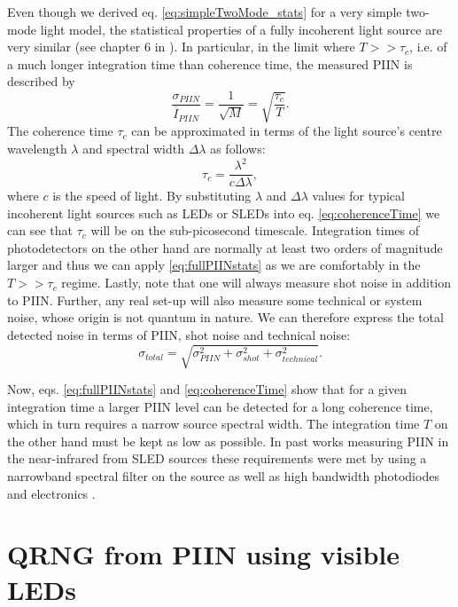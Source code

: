 \documentclass[]{article}
\newcommand*\mean[1]{\overline{#1}}
\begin{document}
	Even though we derived  eq. \ref{eq:simpleTwoMode_stats} for a very simple two-mode light model, the statistical properties of a fully incoherent light source are very similar (see chapter 6 in \cite{goodman_statistical_2000}). In particular, in the limit where $T>>\tau_c$, i.e. of a much longer integration time than coherence time, the measured PIIN is described by
		\begin{equation} 
		\frac{\sigma_{PIIN}}{\mean{I}_{PIIN}} = \frac{1}{\sqrt{M}} = \sqrt{\frac{\tau_c}{T}}.
		\label{eq:fullPIINstats}
		\end{equation}
	The coherence time $\tau_c$ can be approximated in terms of the light source's centre wavelength $\lambda$ and spectral width $\Delta\lambda$ as follows:
		\begin{equation}
		\tau_c = \frac{\lambda^2}{c\Delta\lambda},
		\label{eq:coherenceTime}
		\end{equation}
	where $c$ is the speed of light. By substituting $\lambda$ and $\Delta\lambda$ values for typical incoherent light sources such as LEDs or SLEDs into eq. \ref{eq:coherenceTime} we can see that $\tau_c$ will be on the sub-picosecond timescale. Integration times of photodetectors on the other hand are normally at least two orders of magnitude larger and thus we can apply \ref{eq:fullPIINstats} as we are comfortably in the $T>>\tau_c$ regime. Lastly, note that one will always measure shot noise in addition to PIIN. Further, any real set-up will also measure some technical or system noise, whose origin is not quantum in nature. We can therefore express the total detected noise in terms of PIIN, shot noise and technical noise:
		\begin{equation}
		\sigma_{total} = \sqrt{\sigma_{PIIN}^2 + \sigma_{shot}^2 + \sigma_{technical}^2}.
		\label{eq:noiseContributions}
		\end{equation}

	Now, eqs. \ref{eq:fullPIINstats} and \ref{eq:coherenceTime} show that for a given integration time a larger PIIN level can be detected for a long coherence time, which in turn requires a narrow source spectral width. The integration time $T$ on the other hand must be kept as low as possible. In past works measuring PIIN in the near-infrared from SLED sources these requirements were met by using a narrowband spectral filter on the source as well as high bandwidth photodiodes and electronics \cite{huang_real-time_2014, li_scalable_2011}.

\section{QRNG from PIIN using visible LEDs}
\end{document}
